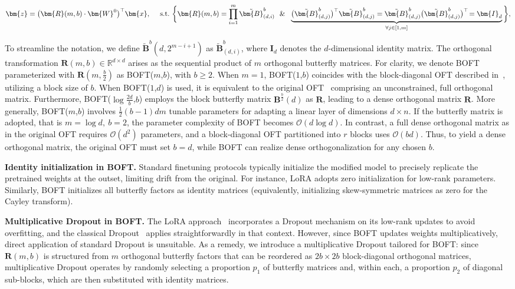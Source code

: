 \begin{equation}
    \begin{aligned}\nonumber
    \bm{z}=\big(\bm{R}(m,b)\cdot\bm{W}^0\big)^\top\bm{x},~~~~\text{s.t.}~\bigg{\{}\bm{R}(m,b)=\prod_{i=1}^m \tilde{\bm{B}}^b_{(d,i)}~~\&~~\underbrace{\big(\tilde{\bm{B}}^b_{(d,j)}\big)^\top\tilde{\bm{B}}^b_{(d,j)}=\tilde{\bm{B}}^b_{(d,j)}\big(\tilde{\bm{B}}^b_{(d,j)}\big)^\top\!=\bm{I}_d}_{\forall j\in [1, m]}\bigg{\}},
    \end{aligned}
\end{equation}

To streamline the notation, we define $\tilde{\bm{B}}^b(d,2^{m - i+1})$ as $\tilde{\bm{B}}^b_{(d,i)}$, where $\bm{I}_d$ denotes the $d$-dimensional identity matrix. The orthogonal transformation $\bm{R}(m,b)\in\mathbb{R}^{d\times d}$ arises as the sequential product of $m$ orthogonal butterfly matrices. For clarity, we denote BOFT parameterized with $\bm{R}(m,\frac{b}{2})$ as BOFT($m$,$b$), with $b \geq 2$. When $m=1$, BOFT($1$,$b$) coincides with the block-diagonal OFT described in~\cite{qiu2023controlling}, utilizing a block size of $b$. When BOFT($1$,$d$) is used, it is equivalent to the original OFT~\cite{qiu2023controlling} comprising an unconstrained, full orthogonal matrix. Furthermore, BOFT($\log \frac{2d}{b}$,$b$) employs the block butterfly matrix $\bm{B}^{\frac{b}{2}}(d)$ as $\bm{R}$, leading to a dense orthogonal matrix $\bm{R}$. More generally, BOFT($m$,$b$) involves $\frac{1}{2}(b-1)dm$ tunable parameters for adapting a linear layer of dimensions $d\times n$. If the butterfly matrix is adopted, that is $m=\log d,~b=2$, the parameter complexity of BOFT becomes $\mathcal{O}(d\log d)$. In contrast, a full dense orthogonal matrix as in the original OFT requires $\mathcal{O}(d^2)$ parameters, and a block-diagonal OFT partitioned into $r$ blocks uses $\mathcal{O}(bd)$. Thus, to yield a dense orthogonal matrix, the original OFT must set $b=d$, while BOFT can realize dense orthogonalization for any chosen $b$.

\textbf{Identity initialization in BOFT.} Standard finetuning protocols typically initialize the modified model to precisely replicate the pretrained weights at the outset, limiting drift from the original. For instance, LoRA adopts zero initialization for low-rank parameters. Similarly, BOFT initializes all butterfly factors as identity matrices (equivalently, initializing skew-symmetric matrices as zero for the Cayley transform).

\textbf{Multiplicative Dropout in BOFT.} The LoRA approach~\cite{hulora2022} incorporates a Dropout mechanism on its low-rank updates to avoid overfitting, and the classical Dropout~\cite{srivastava2014dropout} applies straightforwardly in that context. However, since BOFT updates weights multiplicatively, direct application of standard Dropout is unsuitable. As a remedy, we introduce a multiplicative Dropout tailored for BOFT: since $\bm{R}(m,b)$ is structured from $m$ orthogonal butterfly factors that can be reordered as $2b\times 2b$ block-diagonal orthogonal matrices, multiplicative Dropout operates by randomly selecting a proportion $p_1$ of butterfly matrices and, within each, a proportion $p_2$ of diagonal sub-blocks, which are then substituted with identity matrices.

